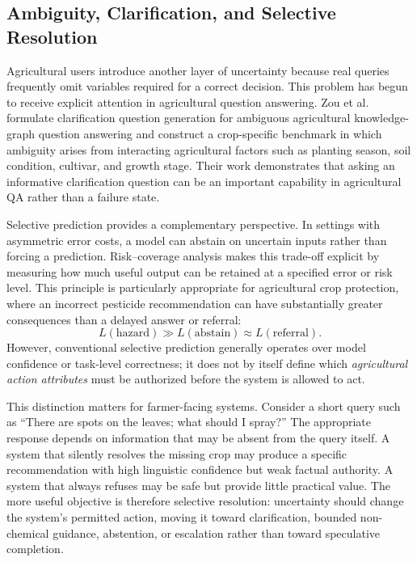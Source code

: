 \documentclass[a4paper,fleqn]{cas-dc}
\begin{document}
\subsection{Ambiguity, Clarification, and Selective Resolution}
Agricultural users introduce another layer of uncertainty because real queries frequently omit variables required for a correct decision. This problem has begun to receive explicit attention in agricultural question answering. Zou et al.~\citep{zou2026} formulate clarification question generation for ambiguous agricultural knowledge-graph question answering and construct a crop-specific benchmark in which ambiguity arises from interacting agricultural factors such as planting season, soil condition, cultivar, and growth stage. Their work demonstrates that asking an informative clarification question can be an important capability in agricultural QA rather than a failure state.

Selective prediction provides a complementary perspective. In settings with asymmetric error costs, a model can abstain on uncertain inputs rather than forcing a prediction. Risk--coverage analysis makes this trade-off explicit by measuring how much useful output can be retained at a specified error or risk level. This principle is particularly appropriate for agricultural crop protection, where an incorrect pesticide recommendation can have substantially greater consequences than a delayed answer or referral:
\begin{equation}
    L(\text{hazard}) \gg L(\text{abstain}) \approx L(\text{referral}).
\end{equation}
However, conventional selective prediction generally operates over model confidence or task-level correctness; it does not by itself define which \emph{agricultural action attributes} must be authorized before the system is allowed to act.

This distinction matters for farmer-facing systems. Consider a short query such as ``There are spots on the leaves; what should I spray?'' The appropriate response depends on information that may be absent from the query itself. A system that silently resolves the missing crop may produce a specific recommendation with high linguistic confidence but weak factual authority. A system that always refuses may be safe but provide little practical value. The more useful objective is therefore selective resolution: uncertainty should change the system's permitted action, moving it toward clarification, bounded non-chemical guidance, abstention, or escalation rather than toward speculative completion.
\end{document}
